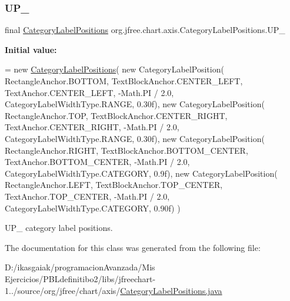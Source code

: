 \subsubsection{\texorpdfstring{U\+P\+\_}{UP\_90}}
{\footnotesize\ttfamily final \mbox{\hyperlink{classorg_1_1jfree_1_1chart_1_1axis_1_1_category_label_positions}{Category\+Label\+Positions}} org.\+jfree.\+chart.\+axis.\+Category\+Label\+Positions.\+U\+P\+\_\hspace{0.3cm}{\ttfamily [static]}}

{\bfseries Initial value\+:}
\begin{DoxyCode}
= \textcolor{keyword}{new} \mbox{\hyperlink{classorg_1_1jfree_1_1chart_1_1axis_1_1_category_label_positions_ac51d8b208b46dc8f7e5adfd72534d801}{CategoryLabelPositions}}(
            \textcolor{keyword}{new} CategoryLabelPosition(
                RectangleAnchor.BOTTOM, TextBlockAnchor.CENTER\_LEFT,
                TextAnchor.CENTER\_LEFT, -Math.PI / 2.0,
                CategoryLabelWidthType.RANGE, 0.30f), 
            \textcolor{keyword}{new} CategoryLabelPosition(
                RectangleAnchor.TOP, TextBlockAnchor.CENTER\_RIGHT,
                TextAnchor.CENTER\_RIGHT, -Math.PI / 2.0,
                CategoryLabelWidthType.RANGE, 0.30f), 
            \textcolor{keyword}{new} CategoryLabelPosition(
                RectangleAnchor.RIGHT, TextBlockAnchor.BOTTOM\_CENTER,
                TextAnchor.BOTTOM\_CENTER, -Math.PI / 2.0,
                CategoryLabelWidthType.CATEGORY, 0.9f), 
            \textcolor{keyword}{new} CategoryLabelPosition(
                RectangleAnchor.LEFT, TextBlockAnchor.TOP\_CENTER,
                TextAnchor.TOP\_CENTER, -Math.PI / 2.0,
                CategoryLabelWidthType.CATEGORY, 0.90f) 
        )
\end{DoxyCode}
U\+P\+\_ category label positions. 

The documentation for this class was generated from the following file\+:\begin{DoxyCompactItemize}
\item 
D\+:/ikasgaiak/programacion\+Avanzada/\+Mis Ejercicios/\+P\+B\+Ldefinitibo2/libs/jfreechart-\/1../source/org/jfree/chart/axis/\mbox{\hyperlink{_category_label_positions_8java}{Category\+Label\+Positions.\+java}}\end{DoxyCompactItemize}

